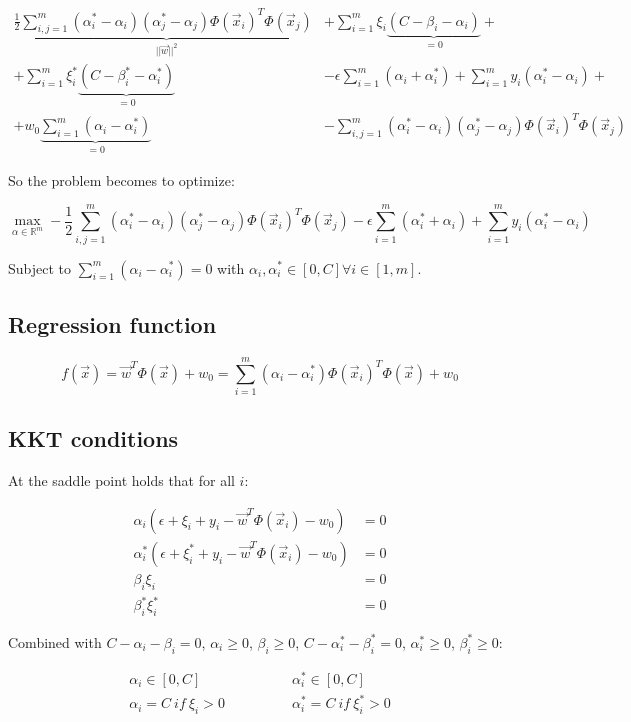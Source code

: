 	\begin{align*}
		\frac{1}{2}\underbrace{\sum\limits_{i,j = 1}^m(\alpha_i^*-\alpha_i)(\alpha_j^*-\alpha_j)\Phi(\vec{x}_i)^T\Phi(\vec{x}_j)}_{||\vec{w}||^2} &+ \sum\limits_{i=1}^m\xi_i\underbrace{(C-\beta_i-\alpha_i)}_{=0}+\\
		+\sum\limits_{i=1}^m\xi_i^*\underbrace{(C-\beta_i^*-\alpha_i^*)}_{=0}&-\epsilon\sum\limits_{i=1}^m(\alpha_i+\alpha_i^*)+\sum\limits_{i=1}^my_i(\alpha_i^*-\alpha_i)+\\
		+w_0\underbrace{\sum\limits_{i=1}^m(\alpha_i-\alpha_i^*)}_{=0}&-\sum\limits_{i,j=1}^m(\alpha_i^*-\alpha_i)(\alpha_j^*-\alpha_j)\Phi(\vec{x}_i)^T\Phi(\vec{x}_j)
	\end{align*}

	So the problem becomes to optimize:

	$$\max\limits_{\alpha\in\mathbb{R}^m}-\frac{1}{2}\sum\limits_{i,j=1}^m(\alpha_i^*-\alpha_i)(\alpha_j^*-\alpha_j)\Phi(\vec{x}_i)^T\Phi(\vec{x}_j)-\epsilon\sum\limits_{i=1}^m(\alpha_i^*+\alpha_i)+\sum\limits_{i=1}^my_i(\alpha_i^*-\alpha_i)$$

	Subject to $\sum\limits_{i=1}^m(\alpha_i-\alpha_i^*) = 0$ with $\alpha_i,\alpha_i^*\in[0,C]\forall i\in [1,m]$.


	\subsection{Regression function}

	$$f(\vec{x}) = \vec{w}^T\Phi(\vec{x}) + w_0 = \sum\limits_{i=1}^m(\alpha_i-\alpha_i^*)\Phi(\vec{x}_i)^T\Phi(\vec{x})+w_0$$

	\subsection{KKT conditions}
	At the saddle point holds that for all $i$:

	\begin{align*}
		\alpha_i(\epsilon+\xi_i+y_i-\vec{w}^T\Phi(\vec{x}_i)-w_0) &= 0\\
		\alpha^*_i(\epsilon+\xi^*_i+y_i-\vec{w}^T\Phi(\vec{x}_i)-w_0) &= 0\\
		\beta_i\xi_i &=0\\
		\beta^*_i\xi^*_i &=0
	\end{align*}

	Combined with $C-\alpha_i-\beta_i= 0$, $\alpha_i\ge0$, $\beta_i\ge 0$, $C-\alpha_i^*-\beta_i^* = 0$, $\alpha_i^*\ge 0$, $\beta_i^*\ge 0$:

	\begin{align*}
		\alpha_i\in [0,C]\qquad&\qquad \alpha_i^*\in[0,C]\\
		\alpha_i=C\ if\ \xi_i>0\qquad &\qquad \alpha_i^*=C\ if\ \xi_i^*>0
	\end{align*}

